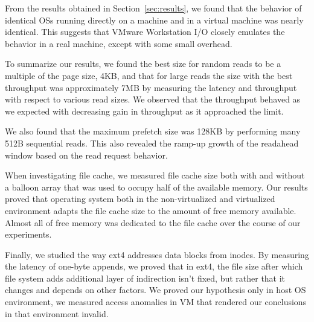 From the results obtained in Section~\ref{sec:results}, we found that the behavior
of identical OSs running directly on a machine and in a virtual machine was 
nearly identical. This suggests that VMware Workstation I/O closely emulates 
the behavior in a real machine, except with some small overhead.

To summarize our results, we found the best size for random reads to be a multiple 
of the page size, 4KB, and that for large reads the size with the best throughput
was approximately 7MB by measuring the latency and throughput with respect to various
read sizes. We observed that the throughput behaved as we expected with decreasing 
gain in throughput as it approached the limit.

We also found that the maximum prefetch size was 128KB by performing many 512B
sequential reads. This also revealed the ramp-up growth of the readahead window
based on the read request behavior.

When investigating file cache, we measured file cache size both with and without a 
balloon array that was used to occupy half of the available memory. 
Our results proved that operating system both in the non-virtualized and virtualized environment 
adapts the file cache size to the amount of free memory available. Almost all of free memory was dedicated
to the file cache over the course of our experiments.

Finally, we studied the way ext4 addresses data blocks from inodes. By measuring the latency of one-byte appends, 
we proved that in ext4, the file size after which file system adds additional layer of indirection isn't fixed,
 but rather that it changes and depends on other factors. We proved our hypothesis only in host OS environment, we
measured access anomalies in VM that rendered our conclusions in that environment invalid.
